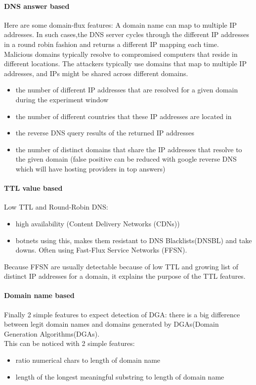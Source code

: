 \paragraph{DNS answer based}
Here are some domain-flux features: A domain name can map to multiple IP addresses. In such cases,the DNS server cycles through the different IP addresses in a round robin fashion and returns a different IP mapping each time. \\
Malicious domains typically resolve to compromised computers that reside in different locations. The attackers typically use domains that map to multiple IP addresses, and IPs might be shared across different domains.
\begin{itemize}[noitemsep]
\item the number of different IP addresses that are resolved for a given domain during the experiment window
\item the number of different countries that these IP addresses are located in
\item the reverse DNS query results of the returned IP addresses
\item the number of distinct domains that share the IP addresses that resolve to the given domain (false positive can be reduced with google reverse DNS which will have hosting providers in top answers)
\end{itemize}
\paragraph{TTL value based}
Low TTL and Round-Robin DNS: \\
\begin{itemize}[noitemsep]
\item high availability (Content Delivery Networks (CDNs))
\item botnets using this, makes them resistant to DNS Blacklists(DNSBL) and take downs. Often using Fast-Flux Service Networks (FFSN).
\end{itemize}
Because FFSN are usually detectable because of low TTL and growing list of distinct IP addresses for a domain, it explains the purpose of the TTL features.
\paragraph{Domain name based}
Finally 2 simple features to expect detection of DGA: there is a big difference between legit domain names and domains generated by DGAs(Domain Generation Algorithms(DGAs).\\
This can be noticed with 2 simple features:\\
\begin{itemize}[noitemsep]
\item ratio numerical chars to length of domain name
\item length of the longest meaningful substring to length of domain name
\end{itemize}

